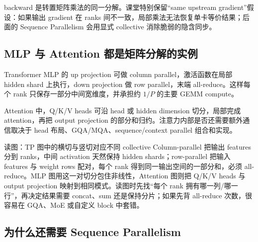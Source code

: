 backward 是转置矩阵乘法的同一分解。课堂特别保留“same upstream gradient”假设：如果输出 gradient 在 ranks 间不一致，局部乘法无法恢复单卡等价结果；后面的 Sequence Parallelism 会用显式 collective 消除脆弱的隐含同步。


\subsection{MLP 与 Attention 都是矩阵分解的实例}

Transformer MLP 的 up projection 可做 column parallel，激活函数在局部 hidden shard 上执行，down projection 做 row parallel，末端 all-reduce。这样每个 rank 只保存一部分中间宽维度，并承担约 $1/P$ 的主要 GEMM compute。


Attention 中，Q/K/V heads 可沿 head 或 hidden dimension 切分，局部完成 attention，再把 output projection 的部分和归约。注意力内部是否还需要额外通信取决于 head 布局、GQA/MQA、sequence/context parallel 组合和实现。



\begin{knowledgebox}{读图：TP 图中的横切与竖切对应不同 collective}
Column-parallel 把输出 features 分到 ranks，中间 activation 天然保持 hidden shards；row-parallel 把输入 features 与 weight rows 配对，每个 rank 得到同一输出空间的一部分和，必须 all-reduce。MLP 图用这一对切分包住非线性，Attention 图则把 Q/K/V heads 与 output projection 映射到相同模式。读图时先找“每个 rank 拥有哪一列/哪一行”，再决定结果需要 concat、sum 还是保持分片；如果先背 all-reduce 次数，很容易在 GQA、MoE 或自定义 block 中套错。
\end{knowledgebox}


\subsection{为什么还需要 Sequence Parallelism}

